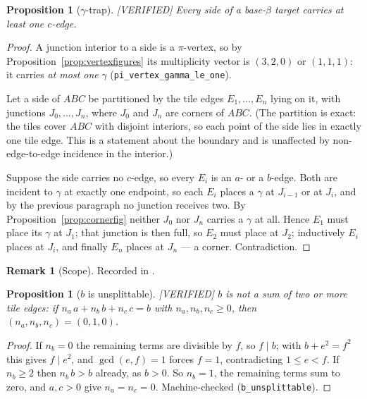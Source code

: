 \documentclass[11pt,reqno]{amsart}
\theoremstyle{plain}
\newtheorem{proposition}[theorem]{Proposition}
\theoremstyle{definition}
\newtheorem{remark}[theorem]{Remark}
\newcommand{\lab}[1]{\hfill\textnormal{\footnotesize\textsc{[#1]}}}
\begin{document}
\begin{proposition}[$\gamma$-trap]\label{prop:gammatrap}\lab{VERIFIED}
Every side of a base-$\beta$ target carries at least one $c$-edge.
\end{proposition}

\begin{proof}
A junction interior to a side is a $\pi$-vertex, so by Proposition~\ref{prop:vertexfigures} its
multiplicity vector is $(3,2,0)$ or $(1,1,1)$: it carries \emph{at most one} $\gamma$
(\texttt{pi\_vertex\_gamma\_le\_one}).

Let a side of $ABC$ be partitioned by the tile edges $E_1,\dots,E_n$ lying on it, with junctions
$J_0,\dots,J_n$, where $J_0$ and $J_n$ are corners of $ABC$. (The partition is exact: the tiles
cover $ABC$ with disjoint interiors, so each point of the side lies in exactly one tile edge. This
is a statement about the boundary and is unaffected by non-edge-to-edge incidence in the interior.)

Suppose the side carries no $c$-edge, so every $E_i$ is an $a$- or a $b$-edge. Both are incident to
$\gamma$ at exactly one endpoint, so each $E_i$ places a $\gamma$ at $J_{i-1}$ or at $J_i$, and by
the previous paragraph no junction receives two. By Proposition~\ref{prop:cornerfig} neither $J_0$
nor $J_n$ carries a $\gamma$ at all. Hence $E_1$ must place its $\gamma$ at $J_1$; that junction is
then full, so $E_2$ must place at $J_2$; inductively $E_i$ places at $J_i$, and finally $E_n$ places
at $J_n$ --- a corner. Contradiction.
\end{proof}

\begin{remark}[Scope]\label{rem:gammascope}
Recorded in \cite{Obstructions}.
\end{remark}

\begin{proposition}[$b$ is unsplittable]\label{prop:bunsplit}\lab{VERIFIED}
$b$ is not a sum of two or more tile edges: if $n_a\,a+n_b\,b+n_c\,c=b$ with $n_a,n_b,n_c\ge0$, then
$(n_a,n_b,n_c)=(0,1,0)$.
\end{proposition}

\begin{proof}
If $n_b=0$ the remaining terms are divisible by $f$, so $f\mid b$; with $b+e^2=f^2$ this gives
$f\mid e^2$, and $\gcd(e,f)=1$ forces $f=1$, contradicting $1\le e<f$. If $n_b\ge2$ then
$n_b\,b>b$ already, as $b>0$. So $n_b=1$, the remaining terms sum to zero, and $a,c>0$ give
$n_a=n_c=0$. Machine-checked (\texttt{b\_unsplittable}).
\end{proof}
\end{document}
